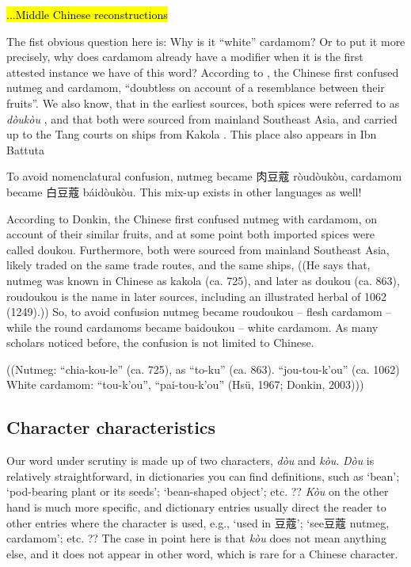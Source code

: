 \documentclass[12pt]{article}
\newcommand{\tc}[1]{\traditionalchinesefont{#1}\rmfamily}
\begin{document}
\hl{...Middle Chinese reconstructions}

The fist obvious question here is: Why is it ``white'' cardamom? Or to put it more precisely, why does cardamom already have a modifier when it is the first attested instance we have of this word? According to \textcite[22]{donkin_2003_east}, the Chinese first confused nutmeg and cardamom, ``doubtless on account of a resemblance between their fruits''. We also know, that in the earliest sources, both spices were referred to as \textit{dòukòu} \parencites{hsu_1967_notes}{donkin_2003_east}, and that both were sourced from mainland Southeast Asia, and carried up to the Tang courts on ships from Kakola \parencite[184-185]{schafer_1985_golden}. This place also appears in Ibn Battuta \parencite{dunn_1986_adventures}


To avoid nomenclatural confusion, nutmeg became 肉豆蔻 ròudòukòu, cardamom became 白豆蔻 báidòukòu.
This mix-up exists in other languages as well!

According to Donkin, the Chinese first confused nutmeg with cardamom, on account of their similar fruits, and at some point both imported spices were called doukou.
Furthermore, both were sourced from mainland Southeast Asia, likely traded on the same trade routes, and the same ships, ((He says that, nutmeg was known in Chinese as kakola (ca. 725), and later as doukou (ca. 863), roudoukou is the name in later sources, including an illustrated herbal of 1062 (1249).))
So, to avoid confusion nutmeg became roudoukou – flesh cardamom – while the round cardamoms became baidoukou – white cardamom.
As many scholars noticed before, the confusion is not limited to Chinese.

((Nutmeg: “chia-kou-le” (ca. 725), as “to-ku” (ca. 863). “jou-tou-k’ou” (ca. 1062)
White cardamom: “tou-k’ou”, “pai-tou-k’ou” (Hsü, 1967; Donkin, 2003)))



\subsection{Character characteristics}

Our word under scrutiny is made up of two characters, \tc{豆} \textit{dòu} and \tc{蔻} \textit{kòu}. \textit{Dòu} is relatively straightforward, in dictionaries you can find definitions, such as `bean'; `pod-bearing plant or its seeds'; `bean-shaped object'; etc. ?? \textit{Kòu} on the other hand is much more specific, and dictionary entries usually direct the reader to other entries where the character is used, e.g., `used in 豆蔻'; `see豆蔻 nutmeg, cardamom'; etc. ?? The case in point here is that \textit{kòu} does not mean anything else, and it does not appear in other word, which is rare for a Chinese character. 
\end{document}
